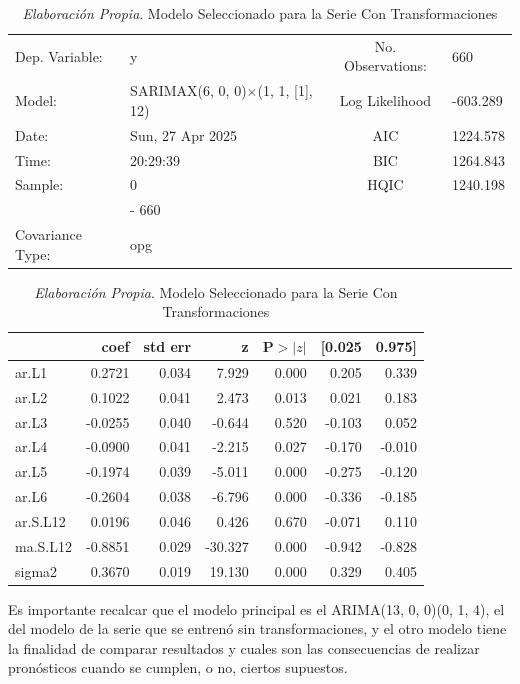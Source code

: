 \documentclass[12pt,letterpaper]{article}   %
\begin{document}
\begin{table}[htbp]
\centering
\tiny
\caption{\textit{Elaboración Propia}. Modelo Seleccionado para la Serie Con Transformaciones}
\begin{tabular}{llcl}
\toprule
Dep. Variable: & y & No. Observations: & 660 \\
Model: & SARIMAX(6, 0, 0)$\times$(1, 1, [1], 12) & Log Likelihood & -603.289 \\
Date: & Sun, 27 Apr 2025 & AIC & 1224.578 \\
Time: & 20:29:39 & BIC & 1264.843 \\
Sample: & 0 & HQIC & 1240.198 \\
        & - 660 & & \\
Covariance Type: & opg & & \\
\bottomrule
\end{tabular}

\vspace{0.3cm}

\begin{tabular}{lrrrrrr}
\toprule
 & \textbf{coef} & \textbf{std err} & \textbf{z} & \textbf{P$>|z|$} & \textbf{[0.025} & \textbf{0.975]} \\
\midrule
ar.L1     & 0.2721 & 0.034 & 7.929 & 0.000 & 0.205 & 0.339 \\
ar.L2     & 0.1022 & 0.041 & 2.473 & 0.013 & 0.021 & 0.183 \\
ar.L3     & -0.0255 & 0.040 & -0.644 & 0.520 & -0.103 & 0.052 \\
ar.L4     & -0.0900 & 0.041 & -2.215 & 0.027 & -0.170 & -0.010 \\
ar.L5     & -0.1974 & 0.039 & -5.011 & 0.000 & -0.275 & -0.120 \\
ar.L6     & -0.2604 & 0.038 & -6.796 & 0.000 & -0.336 & -0.185 \\
ar.S.L12  & 0.0196 & 0.046 & 0.426  & 0.670 & -0.071 & 0.110 \\
ma.S.L12  & -0.8851 & 0.029 & -30.327 & 0.000 & -0.942 & -0.828 \\
sigma2    & 0.3670 & 0.019 & 19.130 & 0.000 & 0.329 & 0.405 \\
\bottomrule
\end{tabular}
\end{table}

Es importante recalcar que el modelo principal es el ARIMA(13, 0, 0)(0, 1, 4), el del modelo de la serie que se entrenó sin transformaciones, y el otro modelo tiene la finalidad de comparar resultados y cuales son las consecuencias de realizar pronósticos cuando se cumplen, o no, ciertos supuestos.
\end{document}
